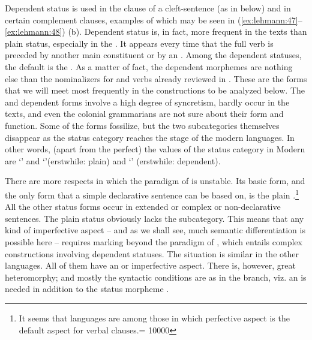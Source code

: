\documentclass[output=paper]{langsci/langscibook}
\begin{document}
\largerpage Dependent status is used in the  clause of a cleft-sentence (as in  below) and in certain complement clauses, examples of which may be seen in (\ref{ex:lehmann:47}–\ref{ex:lehmann:48}) (b). Dependent status is, in fact, more frequent in the texts than plain status, especially in the . It appears every time that the full verb is preceded by another main constituent or by an . Among the dependent statuses, the default is the . As a matter of fact, the  dependent morphemes are nothing else than the nominalizers for  and  verbs already reviewed in .%
 These are the forms that we will meet most frequently in the  constructions to be analyzed below. The  and  dependent forms involve a high degree of syncretism, hardly occur in the texts, and even the colonial grammarians are not sure about their form and function. Some of the forms fossilize, but the two subcategories themselves disappear as the status category reaches the stage of the modern  languages. In other words, (apart from the perfect) the values of the status category in Modern  are ‘’ and ‘’\largerpage (erstwhile: plain) and ‘’ (erstwhile: dependent).

There are more respects in which the paradigm of  is unstable. Its basic form, and the only form that a simple declarative sentence can be based on, is the plain .\footnote{It seems that  languages are among those in which perfective aspect is the default aspect for verbal clauses.{\widowpenalty = 10000}} All the other status forms occur in extended or complex or non-declarative sentences. The plain status obviously lacks the  subcategory. This means that any kind of imperfective aspect – and as we shall see, much semantic differentiation is possible here – requires marking beyond the paradigm of , which entails complex constructions involving dependent statuses. The situation is similar in the other  languages. All of them have an  or imperfective aspect. There is, however, great heteromorphy; and mostly the syntactic conditions are as in the  branch, viz. an  is needed in addition to the status morpheme \citep{Vinogradov2014}.
\end{document}
